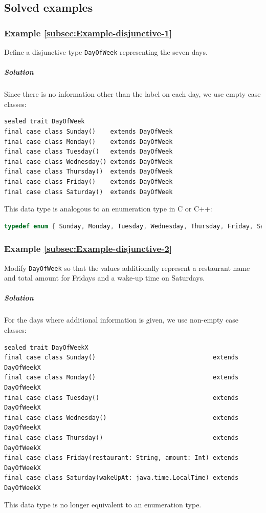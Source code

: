 \subsection{Solved examples}

\subsubsection{Example \label{subsec:Example-disjunctive-1}\ref{subsec:Example-disjunctive-1}}

Define a disjunctive type \lstinline!DayOfWeek! representing the
seven days.

\subparagraph{Solution}

Since there is no information other than the label on each day, we
use empty case classes:
\begin{lstlisting}
sealed trait DayOfWeek
final case class Sunday()    extends DayOfWeek
final case class Monday()    extends DayOfWeek
final case class Tuesday()   extends DayOfWeek
final case class Wednesday() extends DayOfWeek
final case class Thursday()  extends DayOfWeek
final case class Friday()    extends DayOfWeek
final case class Saturday()  extends DayOfWeek
\end{lstlisting}
This data type is analogous to an enumeration type
in C or C++:
\begin{lstlisting}[language={C++}]
typedef enum { Sunday, Monday, Tuesday, Wednesday, Thursday, Friday, Saturday } DayOfWeek;
\end{lstlisting}


\subsubsection{Example \label{subsec:Example-disjunctive-2}\ref{subsec:Example-disjunctive-2}}

Modify \lstinline!DayOfWeek! so that the values additionally represent
a restaurant name and total amount for Fridays and a wake-up time
on Saturdays. 

\subparagraph{Solution}

For the days where additional information is given, we use non-empty
case classes:
\begin{lstlisting}
sealed trait DayOfWeekX
final case class Sunday()                                extends DayOfWeekX
final case class Monday()                                extends DayOfWeekX
final case class Tuesday()                               extends DayOfWeekX
final case class Wednesday()                             extends DayOfWeekX
final case class Thursday()                              extends DayOfWeekX
final case class Friday(restaurant: String, amount: Int) extends DayOfWeekX
final case class Saturday(wakeUpAt: java.time.LocalTime) extends DayOfWeekX
\end{lstlisting}
This data type is no longer equivalent to an enumeration type.

